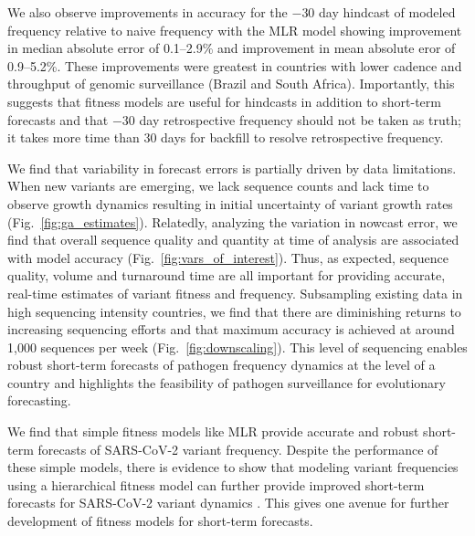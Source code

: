 \documentclass[11pt,oneside,letterpaper]{article}
\begin{document}
We also observe improvements in accuracy for the $-30$ day hindcast of modeled frequency relative to naive frequency with the MLR model showing improvement in median absolute error of 0.1--2.9\% and improvement in mean absolute eror of 0.9--5.2\%.
These improvements were greatest in countries with lower cadence and throughput of genomic surveillance (Brazil and South Africa).
Importantly, this suggests that fitness models are useful for hindcasts in addition to short-term forecasts and that $-30$ day retrospective frequency should not be taken as truth; it takes more time than 30 days for backfill to resolve retrospective frequency.


We find that variability in forecast errors is partially driven by data limitations.
When new variants are emerging, we lack sequence counts and lack time to observe growth dynamics resulting in initial uncertainty of variant growth rates (Fig.~\ref{fig:ga_estimates}).
Relatedly, analyzing the variation in nowcast error, we find that overall sequence quality and quantity at time of analysis are associated with model accuracy (Fig.~\ref{fig:vars_of_interest}).
Thus, as expected, sequence quality, volume and turnaround time are all important for providing accurate, real-time estimates of variant fitness and frequency.
Subsampling existing data in high sequencing intensity countries, we find that there are diminishing returns to increasing sequencing efforts and that maximum accuracy is achieved at around 1,000 sequences per week (Fig.~\ref{fig:downscaling}).
This level of sequencing enables robust short-term forecasts of pathogen frequency dynamics at the level of a country and highlights the feasibility of pathogen surveillance for evolutionary forecasting.


We find that simple fitness models like MLR provide accurate and robust short-term forecasts of SARS-CoV-2 variant frequency.
Despite the performance of these simple models, there is evidence to show that modeling variant frequencies using a hierarchical fitness model can further provide improved short-term forecasts for SARS-CoV-2 variant dynamics \cite{susswein2023leveraging}.
This gives one avenue for further development of fitness models for short-term forecasts.
\end{document}
